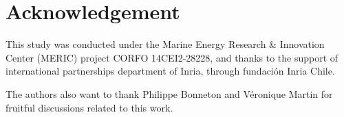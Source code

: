 \section*{Acknowledgement}

\indent This study was conducted under the Marine Energy Research \& Innovation Center (MERIC) project CORFO 14CEI2-28228, and thanks to the support of international partnerships department of Inria, through fundación Inria Chile.

\indent The authors also want to thank Philippe Bonneton and Véronique Martin for fruitful discussions related to this work.